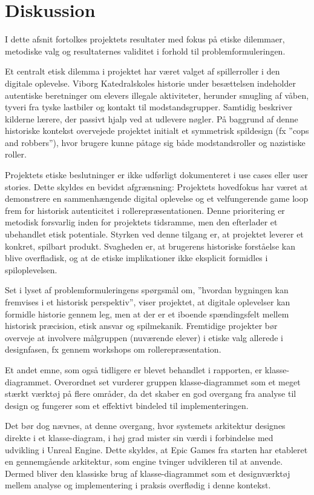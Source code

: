 \section{Diskussion}
I dette afsnit fortolkes projektets resultater med fokus på etiske dilemmaer, metodiske valg og resultaternes validitet i forhold til problemformuleringen.

Et centralt etisk dilemma i projektet har været valget af spillerroller i den digitale oplevelse. Viborg Katedralskoles historie under besættelsen indeholder autentiske beretninger om elevers illegale aktiviteter, herunder smugling af våben, tyveri fra tyske lastbiler og kontakt til modstandsgrupper. \cite{andersen2000viborg} Samtidig beskriver kilderne lærere, der passivt hjalp ved at udlevere nøgler. På baggrund af denne historiske kontekst overvejede projektet initialt et symmetrisk spildesign (fx ”cops and robbers”), hvor brugere kunne påtage sig både modstandsroller og nazistiske roller.

Projektets etiske beslutninger er ikke udførligt dokumenteret i use cases eller user stories. Dette skyldes en bevidst afgrænsning: Projektets hovedfokus har været at demonstrere en sammenhængende digital oplevelse og et velfungerende game loop frem for historisk autenticitet i rollerepræsentationen. Denne prioritering er metodisk forsvarlig inden for projektets tidsramme, men den efterlader et ubehandlet etisk potentiale. Styrken ved denne tilgang er, at projektet leverer et konkret, spilbart produkt. Svagheden er, at brugerens historiske forståelse kan blive overfladisk, og at de etiske implikationer ikke eksplicit formidles i spiloplevelsen.

Set i lyset af problemformuleringens spørgsmål om, ”hvordan bygningen kan fremvises i et historisk perspektiv”, viser projektet, at digitale oplevelser kan formidle historie gennem leg, men at der er et iboende spændingsfelt mellem historisk præcision, etisk ansvar og spilmekanik. Fremtidige projekter bør overveje at involvere målgruppen (nuværende elever) i etiske valg allerede i designfasen, fx gennem workshops om rollerepræsentation.

Et andet emne, som også tidligere er blevet behandlet i rapporten, er klasse-diagrammet. Overordnet set vurderer gruppen klasse-diagrammet som et meget stærkt værktøj på flere områder, da det skaber en god overgang fra analyse til design og fungerer som et effektivt bindeled til implementeringen.

Det bør dog nævnes, at denne overgang, hvor systemets arkitektur designes direkte i et klasse-diagram, i høj grad mister sin værdi i forbindelse med udvikling i Unreal Engine. Dette skyldes, at Epic Games fra starten har etableret en gennemgående arkitektur, som engine tvinger udvikleren til at anvende. Dermed bliver den klassiske brug af klasse-diagrammet som et designværktøj mellem analyse og implementering i praksis overflødig i denne kontekst.

